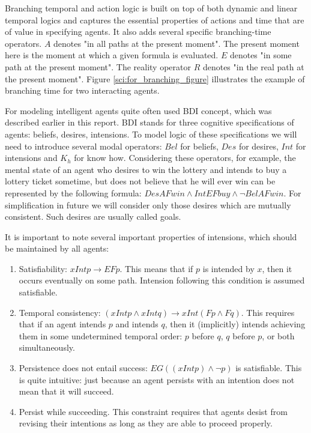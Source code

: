 Branching temporal and action logic is built on top of both dynamic and linear temporal logics and captures the essential properties of actions and time that are of value in specifying agents. It also adds several specific branching-time operators. $A$ denotes "in all paths at the present moment". The present moment here is the moment at which a given formula is evaluated. $E$ denotes "in some path at the present moment". The reality operator $R$ denotes "in the real path at the present moment". Figure \ref{sci:for_branching_figure} illustrates the example of branching time for two interacting agents.

For modeling intelligent agents quite often used BDI concept, which was described earlier in this report. BDI stands for three cognitive specifications of agents: beliefs, desires, intensions. To model logic of these specifications we will need to introduce several modal operators: $Bel$ for beliefs, $Des$ for desires, $Int$ for intensions and $K_h$ for know how. Considering these operators, for example, the mental state of an agent who desires to win the lottery and intends to buy a lottery ticket sometime, but does not believe that he will ever win can be represented by the following formula: $DesAFwin \land IntEFbuy \land \neg BelAFwin$. For simplification in future we will consider only those desires which are mutually consistent. Such desires are usually called goals.

It is important to note several important properties of intensions, which should be maintained by all agents\cite{Singh_92}:
\begin{enumerate}
  \item Satisfiability: $xIntp\rightarrow EFp$. This means that if $p$ is intended by $x$, then it occurs eventually on some path. Intension following this condition is assumed satisfiable.
  \item Temporal consistency: $(xIntp \land xIntq)\rightarrow xInt(Fp \land Fq)$. This requires that if an agent intends $p$ and intends $q$, then it  (implicitly) intends achieving them in some undetermined temporal order: $p$ before $q$, $q$ before $p$, or both simultaneously.
  \item Persistence does not entail success: $EG((xIntp) \land \neg p)$ is satisfiable. This is quite intuitive: just because an agent persists with an intention does not mean that it will succeed.
  \item Persist while succeeding. This constraint requires that agents desist from revising their intentions as long as they are able to proceed properly.
\end{enumerate}

